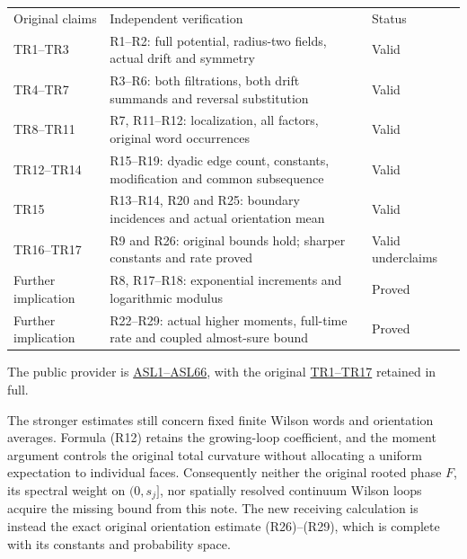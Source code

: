 \documentclass[11pt]{article}
\begin{document}
\begingroup\small\setlength{\tabcolsep}{3pt}\begin{longtable}{@{}p{}p{}p{}@{}}\toprule
Original claims & Independent verification & Status\\
TR1–TR3 & R1–R2: full potential, radius-two fields, actual drift and symmetry & Valid\\
TR4–TR7 & R3–R6: both filtrations, both drift summands and reversal substitution & Valid\\
TR8–TR11 & R7, R11–R12: localization, all factors, original word occurrences & Valid\\
TR12–TR14 & R15–R19: dyadic edge count, constants, modification and common subsequence & Valid\\
TR15 & R13–R14, R20 and R25: boundary incidences and actual orientation mean & Valid\\
TR16–TR17 & R9 and R26: original bounds hold; sharper constants and rate proved & Valid underclaims\\
Further implication & R8, R17–R18: exponential increments and logarithmic modulus & Proved\\
Further implication & R22–R29: actual higher moments, full-time rate and coupled almost-sure bound & Proved\\
\bottomrule\end{longtable}\endgroup

The public provider is \href{https://github.com/KokunoYumeto/yang-mills-interacting-workbench/blob/5017bb93fcafa6f6282b72d076934d793a3ca6ad/yang-mills/continuations/20261011-central-signs-shrinking-window/ACTUAL_SEMIGROUP_LIMIT.md}{ASL1–ASL66}, with the original \href{https://github.com/KokunoYumeto/yang-mills-interacting-workbench/blob/5017bb93fcafa6f6282b72d076934d793a3ca6ad/yang-mills/continuations/20261011-central-signs-shrinking-window/WILSON_TIME_REGULARITY.md}{TR1–TR17} retained in full.

The stronger estimates still concern fixed finite Wilson words and
orientation averages. Formula (R12) retains the growing-loop
coefficient, and the moment argument controls the original total
curvature without allocating a uniform expectation to individual
faces. Consequently neither the original rooted phase \(F\), its
spectral weight on \((0,s_j]\), nor spatially resolved continuum
Wilson loops acquire the missing bound from this note.
The new receiving calculation is instead the exact original
orientation estimate (R26)–(R29), which is complete with its
constants and probability space.
\end{document}
